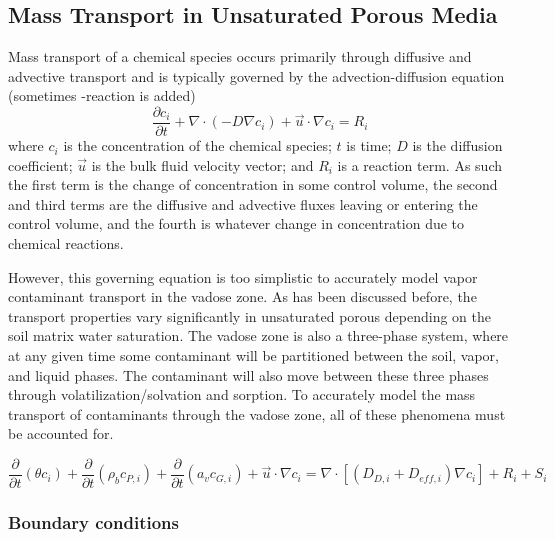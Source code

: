 \subsection{Mass Transport in Unsaturated Porous Media}\label{sec:mass_transport}

Mass transport of a chemical species occurs primarily through diffusive and advective transport and is typically governed by the advection-diffusion equation (sometimes -reaction is added)
\begin{equation}
  \frac{\partial c_i}{\partial t} + \nabla \cdot (-D \nabla c_i) + \vec{u} \cdot \nabla c_i = R_i
\end{equation}
where $c_i$ is the concentration of the chemical species; $t$ is time; $D$ is the diffusion coefficient; $\vec{u}$ is the bulk fluid velocity vector; and $R_i$ is a reaction term.
As such the first term is the change of concentration in some control volume, the second and third terms are the diffusive and advective fluxes leaving or entering the control volume, and the fourth is whatever change in concentration due to chemical reactions.\par

However, this governing equation is too simplistic to accurately model vapor contaminant transport in the vadose zone.
As has been discussed before, the transport properties vary significantly in unsaturated porous depending on the soil matrix water saturation.
The vadose zone is also a three-phase system, where at any given time some contaminant will be partitioned between the soil, vapor, and liquid phases.
The contaminant will also move between these three phases through volatilization/solvation and sorption.
To accurately model the mass transport of contaminants through the vadose zone, all of these phenomena must be accounted for.\par

\begin{equation}
  \frac{\partial}{\partial t} (\theta c_i) +
  \frac{\partial}{\partial t} (\rho_b c_{P,i}) +
  \frac{\partial}{\partial t} (a_v c_{G,i}) +
  \vec{u} \cdot \nabla c_i =
  \nabla \cdot [(D_{D,i} + D_{eff,i}) \nabla c_i] +
  R_i + S_i
\end{equation}


\subsubsection{Boundary conditions}

